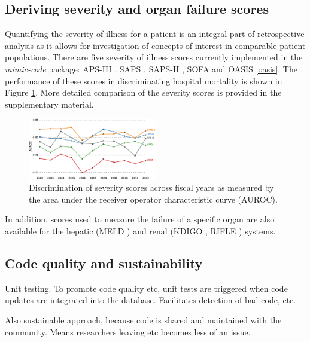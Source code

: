 \documentclass{bioinfo}
\begin{document}
\begin{methods}
\subsection{Deriving severity and organ failure scores}

Quantifying the severity of illness for a patient is an integral part of retrospective analysis as it allows for investigation of concepts of interest in comparable patient populations. There are five severity of illness scores currently implemented in the \emph{mimic-code} package: APS-III \cite{aps}, SAPS \cite{saps}, SAPS-II \cite{sapsii}, SOFA \cite{sofa} and OASIS \ref{oasis}. The performance of these scores in discriminating hospital mortality is shown in Figure \ref{fig:SevScoresOverTime}. More detailed comparison of the severity scores is provided in the supplementary material.

\begin{figure}[!tpb]%
\centerline{\includegraphics[width=0.5\textwidth]{SeverityScoresOverTime.eps}}
\caption{Discrimination of severity scores across fiscal years as measured by the area under the receiver operator characteristic curve (AUROC).}\label{fig:SevScoresOverTime}
\end{figure}

In addition, scores used to measure the failure of a specific organ are also available for the hepatic (MELD \cite{meld}) and renal (KDIGO \cite{kdigo}, RIFLE \cite{rifle}) systems.


\subsection{Code quality and sustainability}

Unit testing. To promote code quality etc, unit tests are triggered when code updates are integrated into the database. Facilitates detection of bad code, etc.

Also sustainable approach, because code is shared and maintained with the community. Means researchers leaving etc becomes less of an issue.

\end{methods}
\end{document}
